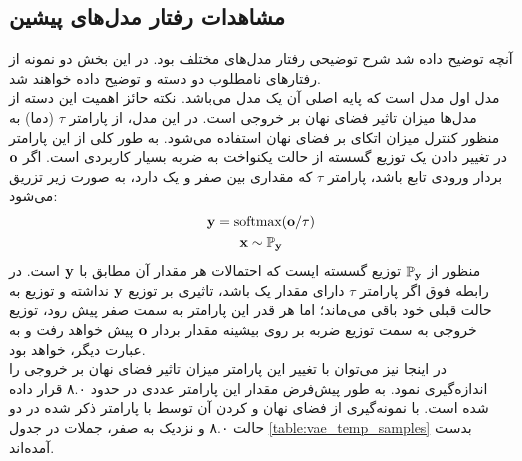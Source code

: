 \subsection{مشاهدات رفتار مدل‌های پیشین}
آنچه توضیح داده شد شرح توضیحی رفتار مدل‌های مختلف بود. در این بخش دو نمونه از رفتارهای نامطلوب دو دسته \gan{} و \vae{} توضیح داده خواهند شد.
\\
مدل اول مدل \towardctg{} است که پایه اصلی آن یک مدل \vae{} می‌باشد. نکته حائز اهمیت این دسته از مدل‌ها میزان تاثیر فضای نهان بر خروجی \decoder{} است. در این مدل، از پارامتر $\tau$ (دما) به منظور کنترل میزان اتکای \decoder{} بر فضای نهان استفاده می‌شود. به طور کلی از این پارامتر در تغییر دادن یک توزیع گسسته از حالت یکنواخت به ضربه بسیار کاربردی است. اگر ${\bf o}$ بردار ورودی تابع \softmax{} باشد، پارامتر $\tau{}$ که مقداری بین صفر و یک دارد، به صورت زیر تزریق می‌شود:
\begin{gather}
	{\bf y} = \text{softmax}({\bf o}/\tau) \\
	{\bf x} \sim \mathbb P_{\bf y} \nonumber
\end{gather}
منظور از $\mathbb P_{\bf y}$ توزیع گسسته ایست که احتمالات هر مقدار آن مطابق با ${\bf y}$ است. در رابطه فوق اگر پارامتر $\tau$ دارای مقدار یک باشد، تاثیری بر توزیع ${\bf y}$ نداشته و توزیع به حالت قبلی خود باقی می‌ماند؛ اما هر قدر این پارامتر به سمت صفر پیش رود، توزیع خروجی \softmax{} به سمت توزیع ضربه بر روی بیشینه مقدار بردار ${\bf o}$ پیش خواهد رفت و به عبارت دیگر، \greedydecoding{} خواهد بود. \\
در اینجا نیز می‌توان با تغییر این پارامتر میزان تاثیر فضای نهان بر خروجی \decoder{} را اندازه‌گیری نمود. به طور پیش‌فرض مقدار این پارامتر عددی در حدود ۸.۰ قرار داده شده است. با نمونه‌گیری از فضای نهان و \decode{} کردن آن توسط \decoder{} با پارامتر ذکر شده در دو حالت ۸.۰ و نزدیک به صفر، جملات در جدول 
\ref{table:vae_temp_samples}
بدست آمده‌اند.
